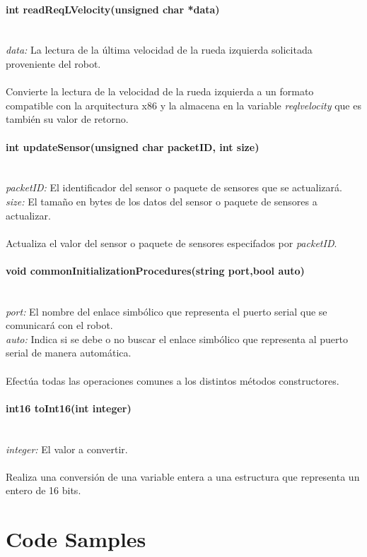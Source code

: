 \documentclass[letterpaper]{book}
\begin{document}
\subsubsection{int readReqLVelocity(unsigned char *data)}\mbox{}\\
\emph{data: }La lectura de la última velocidad de la rueda izquierda solicitada proveniente del robot.\\\\
Convierte la lectura de la velocidad de la rueda izquierda a un formato compatible con la arquitectura x86 y la almacena en la variable \emph{reqlvelocity} que es también su valor de retorno.\\ 

\subsubsection{int updateSensor(unsigned char packetID, int size)}\mbox{}\\
\emph{packetID: }El identificador del sensor o paquete de sensores que se actualizará.\\
\emph{size: }El tamaño en bytes de los datos del sensor o paquete de sensores a actualizar.\\\\
Actualiza el valor del sensor o paquete de sensores especifados por \emph{packetID}.\\

\subsubsection{void commonInitializationProcedures(string port,bool auto)}\mbox{}\\
\emph{port: }El nombre del enlace simbólico que representa el puerto serial que se comunicará con el robot.\\
\emph{auto: }Indica si se debe o no buscar el enlace simbólico que representa al puerto serial de manera automática.\\\\
Efectúa todas las operaciones comunes a los distintos métodos constructores.

\subsubsection{int16 toInt16(int integer)}\mbox{}\\
\emph{integer: }El valor a convertir.\\\\
Realiza una conversión de una variable entera a una estructura que representa un entero de 16 bits.



\chapter{Code Samples}
\end{document}

